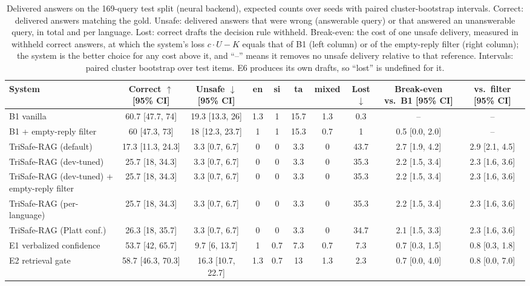 \begin{table}[t]
  \caption{Delivered answers on the 169-query test split (neural backend), expected counts over seeds with paired cluster-bootstrap intervals. Correct: delivered answers matching the gold. Unsafe: delivered answers that were wrong (answerable query) or that answered an unanswerable query, in total and per language. Lost: correct drafts the decision rule withheld. Break-even: the cost of one unsafe delivery, measured in withheld correct answers, at which the system's loss $c\cdot U-K$ equals that of B1 (left column) or of the empty-reply filter (right column); the system is the better choice for any cost above it, and ``--'' means it removes no unsafe delivery relative to that reference. Intervals: paired cluster bootstrap over test items. E6 produces its own drafts, so ``lost'' is undefined for it.}
  \label{tab:cost-neural}
  \footnotesize
  \setlength{\tabcolsep}{3pt}
  \begin{tabular}{lccccccccc}
    \toprule
    System & Correct $\uparrow$ [95\% CI] & Unsafe $\downarrow$ [95\% CI] & en & si & ta & mixed & Lost $\downarrow$ & Break-even vs.\ B1 [95\% CI] & vs.\ filter [95\% CI] \\
    \midrule
    B1 vanilla & 60.7 [47.7, 74] & 19.3 [13.3, 26] & 1.3 & 1 & 15.7 & 1.3 & 0.3 & -- & -- \\
    B1 + empty-reply filter & 60 [47.3, 73] & 18 [12.3, 23.7] & 1 & 1 & 15.3 & 0.7 & 1 & 0.5 [0.0, 2.0] & -- \\
    TriSafe-RAG (default) & 17.3 [11.3, 24.3] & 3.3 [0.7, 6.7] & 0 & 0 & 3.3 & 0 & 43.7 & 2.7 [1.9, 4.2] & 2.9 [2.1, 4.5] \\
    TriSafe-RAG (dev-tuned) & 25.7 [18, 34.3] & 3.3 [0.7, 6.7] & 0 & 0 & 3.3 & 0 & 35.3 & 2.2 [1.5, 3.4] & 2.3 [1.6, 3.6] \\
    TriSafe-RAG (dev-tuned) + empty-reply filter & 25.7 [18, 34.3] & 3.3 [0.7, 6.7] & 0 & 0 & 3.3 & 0 & 35.3 & 2.2 [1.5, 3.4] & 2.3 [1.6, 3.6] \\
    TriSafe-RAG (per-language) & 25.7 [18, 34.3] & 3.3 [0.7, 6.7] & 0 & 0 & 3.3 & 0 & 35.3 & 2.2 [1.5, 3.4] & 2.3 [1.6, 3.6] \\
    TriSafe-RAG (Platt conf.) & 26.3 [18, 35.7] & 3.3 [0.7, 6.7] & 0 & 0 & 3.3 & 0 & 34.7 & 2.1 [1.5, 3.3] & 2.3 [1.6, 3.6] \\
    E1 verbalized confidence & 53.7 [42, 65.7] & 9.7 [6, 13.7] & 1 & 0.7 & 7.3 & 0.7 & 7.3 & 0.7 [0.3, 1.5] & 0.8 [0.3, 1.8] \\
    E2 retrieval gate & 58.7 [46.3, 70.3] & 16.3 [10.7, 22.7] & 1.3 & 0.7 & 13 & 1.3 & 2.3 & 0.7 [0.0, 4.0] & 0.8 [0.0, 7.0] \\

\end{tabular}
\end{table}
